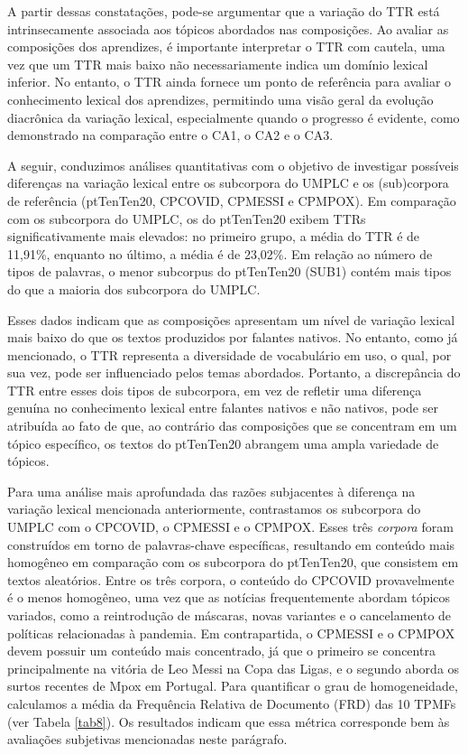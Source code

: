 \documentclass[portuguese]{textolivre}
\begin{document}
A partir dessas constatações, pode-se argumentar que a variação do TTR está intrinsecamente associada aos tópicos abordados nas composições. Ao avaliar as composições dos aprendizes, é importante interpretar o TTR com cautela, uma vez que um TTR mais baixo não necessariamente indica um domínio lexical inferior. No entanto, o TTR ainda fornece um ponto de referência para avaliar o conhecimento lexical dos aprendizes, permitindo uma visão geral da evolução diacrônica da variação lexical, especialmente quando o progresso é evidente, como demonstrado na comparação entre o CA1, o CA2 e o CA3.

A seguir, conduzimos análises quantitativas com o objetivo de investigar possíveis diferenças na variação lexical entre os subcorpora do UMPLC e os (sub)corpora de referência (ptTenTen20, CPCOVID, CPMESSI e CPMPOX). Em comparação com os subcorpora do UMPLC, os do ptTenTen20 exibem TTRs significativamente mais elevados: no primeiro grupo, a média do TTR é de 11,91\%, enquanto no último, a média é de 23,02\%. Em relação ao número de tipos de palavras, o menor subcorpus do ptTenTen20 (SUB1) contém mais tipos do que a maioria dos subcorpora do UMPLC.

Esses dados indicam que as composições apresentam um nível de variação lexical mais baixo do que os textos produzidos por falantes nativos. No entanto, como já mencionado, o TTR representa a diversidade de vocabulário em uso, o qual, por sua vez, pode ser influenciado pelos temas abordados. Portanto, a discrepância do TTR entre esses dois tipos de subcorpora, em vez de refletir uma diferença genuína no conhecimento lexical entre falantes nativos e não nativos, pode ser atribuída ao fato de que, ao contrário das composições que se concentram em um tópico específico, os textos do ptTenTen20 abrangem uma ampla variedade de tópicos.

Para uma análise mais aprofundada das razões subjacentes à diferença na variação lexical mencionada anteriormente, contrastamos os subcorpora do UMPLC com o CPCOVID, o CPMESSI e o CPMPOX. Esses três \textit{corpora} foram construídos em torno de palavras-chave específicas, resultando em conteúdo mais homogêneo em comparação com os subcorpora do ptTenTen20, que consistem em textos aleatórios. Entre os três corpora, o conteúdo do CPCOVID provavelmente é o menos homogêneo, uma vez que as notícias frequentemente abordam tópicos variados, como a reintrodução de máscaras, novas variantes e o cancelamento de políticas relacionadas à pandemia. Em contrapartida, o CPMESSI e o CPMPOX devem possuir um conteúdo mais concentrado, já que o primeiro se concentra principalmente na vitória de Leo Messi na Copa das Ligas, e o segundo aborda os surtos recentes de Mpox em Portugal. Para quantificar o grau de homogeneidade, calculamos a média da Frequência Relativa de Documento (FRD) das 10 TPMFs (ver Tabela \ref{tab8}). Os resultados indicam que essa métrica corresponde bem às avaliações subjetivas mencionadas neste parágrafo.
\end{document}
